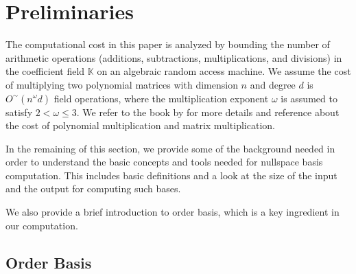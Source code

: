
\section{Preliminaries}

\label{sec:Background}

The computational cost in this paper is analyzed by bounding the number
of arithmetic operations (additions, subtractions, multiplications,
and divisions) in the coefficient field $\mathbb{K}$ on an algebraic
random access machine. We assume the cost of multiplying two polynomial
matrices with dimension $n$ and degree $d$ is $O^{\sim}(n^{\omega}d)$
field operations, where the multiplication exponent $\omega$ is assumed
to satisfy $2<\omega\le3$. We refer to the book by \citet{vonzurgathen}
for more details and reference about the cost of polynomial multiplication
and matrix multiplication.

In the remaining of this section, we provide some of the background
needed in order to understand the basic concepts and tools needed
for nullspace basis computation. This includes basic definitions and
a look at the size of the input and the output for computing such
bases.%
\begin{comment}
, which provide lower bounds for the computational cost 
\end{comment}
{} We also provide a brief introduction to order basis, which is a key
ingredient in our computation. 


\subsection{Order Basis}

